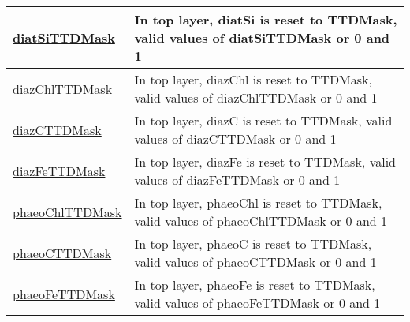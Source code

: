 {\begin{center}
\begin{longtable}{| p{2.0in} | p{4.0in} |}
    \hline
    \hyperref[subsec:var_sec_tracersTTDFields_diatSiTTDMask]{diatSiTTDMask} & In top layer, diatSi is reset to TTDMask, valid values of diatSiTTDMask or 0 and 1 \\
    \hline
    \hyperref[subsec:var_sec_tracersTTDFields_diazChlTTDMask]{diazChlTTDMask} & In top layer, diazChl is reset to TTDMask, valid values of diazChlTTDMask or 0 and 1 \\
    \hline
    \hyperref[subsec:var_sec_tracersTTDFields_diazCTTDMask]{diazCTTDMask} & In top layer, diazC is reset to TTDMask, valid values of diazCTTDMask or 0 and 1 \\
    \hline
    \hyperref[subsec:var_sec_tracersTTDFields_diazFeTTDMask]{diazFeTTDMask} & In top layer, diazFe is reset to TTDMask, valid values of diazFeTTDMask or 0 and 1 \\
    \hline
    \hyperref[subsec:var_sec_tracersTTDFields_phaeoChlTTDMask]{phaeoChlTTDMask} & In top layer, phaeoChl is reset to TTDMask, valid values of phaeoChlTTDMask or 0 and 1 \\
    \hline
    \hyperref[subsec:var_sec_tracersTTDFields_phaeoCTTDMask]{phaeoCTTDMask} & In top layer, phaeoC is reset to TTDMask, valid values of phaeoCTTDMask or 0 and 1 \\
    \hline
    \hyperref[subsec:var_sec_tracersTTDFields_phaeoFeTTDMask]{phaeoFeTTDMask} & In top layer, phaeoFe is reset to TTDMask, valid values of phaeoFeTTDMask or 0 and 1 \\
    \hline
\end{longtable}
\end{center}
}
